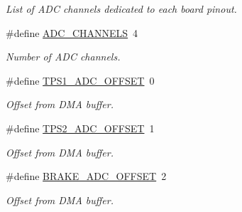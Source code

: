 \begin{DoxyCompactItemize}
\begin{DoxyCompactList}\small\item\em List of A\+DC channels dedicated to each board pinout. \end{DoxyCompactList}\item 
\mbox{\label{group___board__model__group_ga065dcfa648ca52ed6214008cb177de36}} 
\#define \mbox{\hyperlink{group___board__model__group_ga065dcfa648ca52ed6214008cb177de36}{A\+D\+C\+\_\+\+C\+H\+A\+N\+N\+E\+LS}}~4
\begin{DoxyCompactList}\small\item\em Number of A\+DC channels. \end{DoxyCompactList}\item 
\mbox{\label{group___board__model__group_ga7ce02d79fba23321a377a26a963e2bdf}} 
\#define \mbox{\hyperlink{group___board__model__group_ga7ce02d79fba23321a377a26a963e2bdf}{T\+P\+S1\+\_\+\+A\+D\+C\+\_\+\+O\+F\+F\+S\+ET}}~0
\begin{DoxyCompactList}\small\item\em Offset from D\+MA buffer. \end{DoxyCompactList}\item 
\mbox{\label{group___board__model__group_ga24019e59e805c7acf8f816e141d3d689}} 
\#define \mbox{\hyperlink{group___board__model__group_ga24019e59e805c7acf8f816e141d3d689}{T\+P\+S2\+\_\+\+A\+D\+C\+\_\+\+O\+F\+F\+S\+ET}}~1
\begin{DoxyCompactList}\small\item\em Offset from D\+MA buffer. \end{DoxyCompactList}\item 
\mbox{\label{group___board__model__group_gade98eccd60c9b68cde78ca4c0009a84c}} 
\#define \mbox{\hyperlink{group___board__model__group_gade98eccd60c9b68cde78ca4c0009a84c}{B\+R\+A\+K\+E\+\_\+\+A\+D\+C\+\_\+\+O\+F\+F\+S\+ET}}~2
\begin{DoxyCompactList}\small\item\em Offset from D\+MA buffer. \end{DoxyCompactList}\item 
\mbox{\label{group___board__model__group_ga58133efa918e1af6c0cc436137c78cc0}} 

\end{DoxyCompactItemize}
